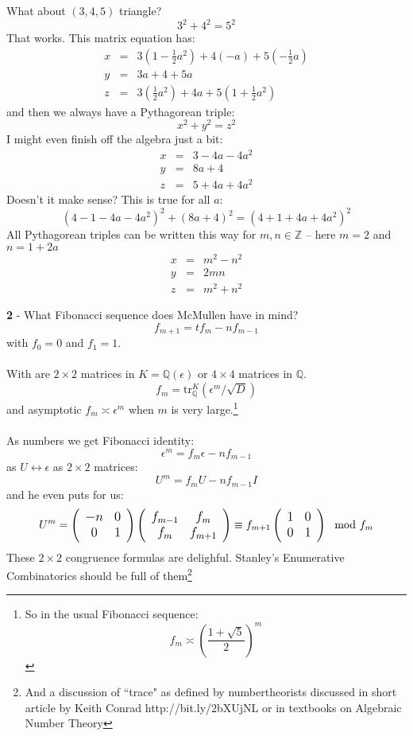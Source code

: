 \documentclass[12pt]{article}
\begin{document}
\noindent What about $(3,4,5)$ triangle? 
$$ 3^2 + 4^2 = 5^2 $$
That works.  This matrix equation has:
\begin{eqnarray}
x &=& 3(1 - \frac{1}{2}a^2)+ 4(-a)+5(- \frac{1}{2}a)    \\
y&=& 3a + 4 + 5a \\
z&=&  
3( \frac{1}{2}a^2)+ 4a + 5(1+ \frac{1}{2}a^2)
\end{eqnarray}
and then we always have a Pythagorean triple:
$$ x^2 + y^2 = z^2  $$
I might even finish off the algebra just a bit:
\begin{eqnarray}
x &=& 3-4a -4a^2   \\
y&=& 8a + 4 \\
z&=&  
5 + 4a + 4a^2
\end{eqnarray}
Doesn't it make sense?  This is true for all $a$:
$$ (4 - 1 - 4a - 4a^2)^2 + (8a + 4)^2 
= (4 + 1 +4a + 4a^2)^2 $$
All Pythagorean triples can be written this way for $m, n \in \mathbb{Z}$ -- here $m = 2$ and $n = 1 + 2a$
\begin{eqnarray}
x &=& m^2-n^2   \\
y&=& 2mn \\
z&=&  
m^2+n^2
\end{eqnarray}



\newpage

\noindent \textbf{2} - What Fibonacci sequence does McMullen have in mind?
$$ f_{m+1} = t f_m - n f_{m-1} $$
with $f_0 = 0$ and $f_1 = 1$.  \\ \\ With are $2 \times 2$ matrices in $K = \mathbb{Q}(\epsilon)$ or $4 \times 4$ matrices in $\mathbb{Q}$.  
$$ f_m = \mathrm{tr}_\mathbb{Q}^K (\epsilon^m / \sqrt{D}) $$
and asymptotic $f_m \asymp \epsilon^m$ when $m$ is very large.\footnote{So in the usual Fibonacci sequence:
$$ f_m \asymp \left( \frac{1+\sqrt{5}}{2}\right)^m  $$  } \\ \\
As numbers we get Fibonacci identity:
$$ \epsilon^m = f_m \epsilon - n f_{m-1}$$
as $U \leftrightarrow \epsilon$ as $2 \times 2$ matrices:
$$ U^m = f_m U - n f_{m-1}I $$
and he even puts for us:
$$ \large U^m = \left(
\begin{array}{cc}  -n & 0 \\ 0 & 1 \end{array}
 \right)
 \left(
\begin{array}{cc}  f_{m-1} & f_m \\ f_m & f_{m+1} \end{array}
 \right) \equiv f_{m+1} \left(
 \begin{array}{cc}
 1 & 0 \\ 0 & 1
  \end{array}
 \right) \mod f_m
 $$
These $2 \times 2$ congruence formulas are delighful.  Stanley's Enumerative Combinatorics should be full of them\footnote{And a discussion of ``trace" as defined by numbertheorists discussed in short article by Keith Conrad http://bit.ly/2bXUjNL or in textbooks on Algebraic Number Theory }
\end{document}
